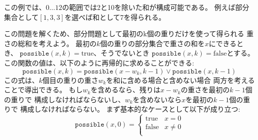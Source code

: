 \begin{comment}
In this case, all sums between $0 \ldots 12$
are possible, except 2 and 10.
For example, the sum 7 is possible because we
can select the weights $[1,3,3]$.

To solve the problem, we focus on subproblems
where we only use the first $k$ weights
to construct sums.
Let $\texttt{possible}(x,k)=\textrm{true}$ if
we can construct a sum $x$
using the first $k$ weights,
and otherwise $\texttt{possible}(x,k)=\textrm{false}$.
The values of the function can be recursively
calculated as follows:
\[ \texttt{possible}(x,k) = \texttt{possible}(x-w_k,k-1) \lor \texttt{possible}(x,k-1) \]
The formula is based on the fact that we can
either use or not use the weight $w_k$ in the sum.
If we use $w_k$, the remaining task is to
form the sum $x-w_k$ using the first $k-1$ weights,
and if we do not use $w_k$,
the remaining task is to form the sum $x$
using the first $k-1$ weights.
As the base cases,
\end{comment}

この例では、$0 \ldots 12$の範囲では2と10を除いた和が構成可能である。
例えば部分集合として$[1,3,3]$を選べば和として7を得られる。

この問題を解くため、部分問題として最初のk個の重りだけを使って得られる
重さの総和を考えよう。
最初の$k$個の重りの部分集合で重さの和を$x$にできるとき、
$\texttt{possible}(x,k)=\textrm{true}$、そうでないとき
$\texttt{possible}(x,k)=\textrm{false}$とする。
この関数の値は、以下のように再帰的に求めることができる:
\[ \texttt{possible}(x,k) = \texttt{possible}(x-w_k,k-1) \lor \texttt{possible}(x,k-1) \]
この式は、$k$個目の重りの重さ$w_k$を和に含める場合と含めない場合
両方を考えることで導出できる。
もし$w_k$を含めるなら、残りは$x-w_k$の重さを最初の$k-1$個の重りで
構成しなければならないし、$w_k$を含めないなら$x$を最初の$k-1$個の重りで
構成しなければならない。
まず基本的なケースとして以下が成り立つ:
\begin{equation*}
    \texttt{possible}(x,0) = \begin{cases}
               \textrm{true}    & x = 0\\
               \textrm{false}   & x \neq 0 \\
           \end{cases}
\end{equation*}

\begin{comment}
because if no weights are used,
we can only form the sum 0.


The following table shows all values of the function
for the weights $[1,3,3,5]$ :
\end{comment}

